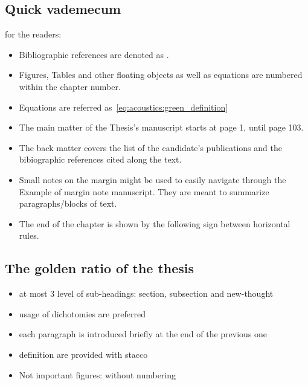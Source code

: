 \subsection{Quick vademecum} for the readers:
\begin{itemize}
    \item Bibliographic references are denoted as \cite{kuttruff2016room}.
    \item Figures, Tables and other floating objects as well as equations are numbered within the chapter number.
    \item Equations are referred as~\cref{eq:acoustics:green_definition}
    \item The main matter of the Thesis’s manuscript starts at page 1, until page 103.
    \item The back matter covers the list of the candidate’s publications and the bibiographic references cited along the text.
    \item Small notes on the margin might be used to easily navigate through the Example of margin note manuscript. They are meant to summarize paragraphs/blocks of text.
    \item The end of the chapter is shown by the following sign between horizontal rules.
\end{itemize}

\subsection{The golden ratio of the thesis}
\begin{itemize}
    \item at most 3 level of sub-headings: section, subsection and new-thought
    \item usage of dichotomies are preferred
    \item each paragraph is introduced briefly at the end of the previous one
    \item definition are provided with stacco
    \item Not important figures: without numbering
\end{itemize}